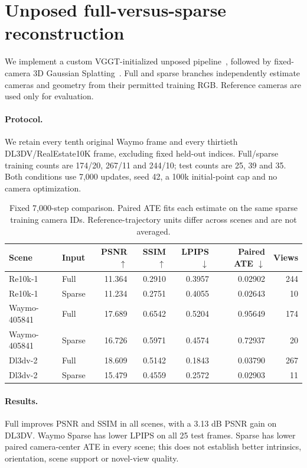 \section{Unposed full-versus-sparse reconstruction}
\label{sec:part2}
We implement a custom VGGT-initialized unposed pipeline~\cite{wang2025vggt}, followed by fixed-camera 3D Gaussian Splatting~\cite{kerbl2023gaussians}. Full and sparse branches independently estimate cameras and geometry from their permitted training RGB. Reference cameras are used only for evaluation.
\paragraph{Protocol.} We retain every tenth original Waymo frame and every thirtieth DL3DV/RealEstate10K frame, excluding fixed held-out indices. Full/sparse training counts are 174/20, 267/11 and 244/10; test counts are 25, 39 and 35. Both conditions use 7,000 updates, seed 42, a 100k initial-point cap and no camera optimization.
\begin{table}[t]\centering\small
\begin{tabular}{llrrrrr}\toprule Scene & Input & PSNR $\uparrow$ & SSIM $\uparrow$ & LPIPS $\downarrow$ & Paired ATE $\downarrow$ & Views \\ \midrule
Re10k-1 & Full & 11.364 & 0.2910 & 0.3957 & 0.02902 & 244 \\
Re10k-1 & Sparse & 11.234 & 0.2751 & 0.4055 & 0.02643 & 10 \\
Waymo-405841 & Full & 17.689 & 0.6542 & 0.5204 & 0.95649 & 174 \\
Waymo-405841 & Sparse & 16.726 & 0.5971 & 0.4574 & 0.72937 & 20 \\
Dl3dv-2 & Full & 18.609 & 0.5142 & 0.1843 & 0.03790 & 267 \\
Dl3dv-2 & Sparse & 15.479 & 0.4559 & 0.2572 & 0.02903 & 11 \\
\bottomrule\end{tabular}\caption{Fixed 7,000-step comparison. Paired ATE fits each estimate on the same sparse training camera IDs. Reference-trajectory units differ across scenes and are not averaged.}\label{tab:part2_main}\end{table}
\paragraph{Results.} Full improves PSNR and SSIM in all scenes, with a 3.13 dB PSNR gain on DL3DV. Waymo Sparse has lower LPIPS on all 25 test frames. Sparse has lower paired camera-center ATE in every scene; this does not establish better intrinsics, orientation, scene support or novel-view quality.
